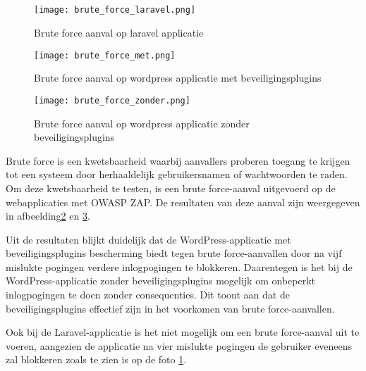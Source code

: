 \subsection{}
\begin{figure}
    \centering
    \texttt{[image: brute\_force\_laravel.png]}
    \caption[Brute force aanval op laravel applicatie]{Brute force aanval op laravel applicatie}
    \label{fig:brute_force_laravel}
\end{figure}
\begin{figure}
    \centering
    \texttt{[image: brute\_force\_met.png]}
    \caption[Brute force aanval op wordpress applicatie met beveiligingsplugins]{Brute force aanval op wordpress applicatie met beveiligingsplugins}
    \label{fig:brute_force_met}
\end{figure}
\begin{figure}
    \centering
    \texttt{[image: brute\_force\_zonder.png]}
    \caption[Brute force aanval op wordpress applicatie zonder beveiligingsplugins]{Brute force aanval op wordpress applicatie zonder beveiligingsplugins}
    \label{fig:brute_force_zonder}
\end{figure}

Brute force is een kwetsbaarheid waarbij aanvallers proberen toegang te krijgen tot een systeem door herhaaldelijk gebruikersnamen 
of wachtwoorden te raden. Om deze kwetsbaarheid te testen, is een brute force-aanval uitgevoerd op de webapplicaties met OWASP ZAP. De 
resultaten van deze aanval zijn weergegeven in afbeelding\ref{fig:brute_force_met} en \ref{fig:brute_force_zonder}. 

Uit de resultaten blijkt duidelijk dat de WordPress-applicatie met beveiligingsplugins bescherming biedt tegen brute 
force-aanvallen door na vijf mislukte pogingen verdere inlogpogingen te blokkeren. Daarentegen is het bij de 
WordPress-applicatie zonder beveiligingsplugins mogelijk om onbeperkt inlogpogingen te doen zonder consequenties. Dit toont 
aan dat de beveiligingsplugins effectief zijn in het voorkomen van brute force-aanvallen.

Ook bij de Laravel-applicatie is het niet mogelijk om een brute force-aanval uit te voeren, aangezien de applicatie na vier 
mislukte pogingen de gebruiker eveneens zal blokkeren zoals te zien is op de foto \ref{fig:brute_force_laravel}.
